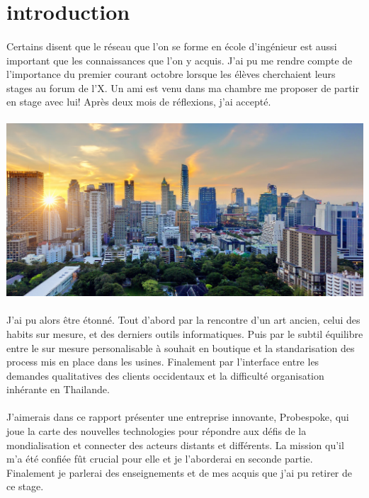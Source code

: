 \section*{introduction}
\paragraph{}
Certains disent que le réseau que l'on se forme en école d'ingénieur est aussi important que les connaissances que l'on y acquis. J'ai pu me rendre compte de l'importance du premier courant octobre lorsque les élèves cherchaient leurs stages au forum de l'X. Un ami est venu dans ma chambre me proposer de partir en stage avec lui! Après deux mois de réflexions, j'ai accepté.
\paragraph{}
\includegraphics[width=16cm]{image/business.jpg}
\paragraph{}
J'ai pu alors être étonné. Tout d'abord par la rencontre d'un art ancien, celui des habits sur mesure, et des derniers outils informatiques. Puis par le subtil équilibre entre le sur mesure personalisable à souhait en boutique et la standarisation des process mis en place dans les usines. Finalement par l'interface entre les demandes qualitatives des clients occidentaux et la difficulté organisation inhérante en Thailande.
\paragraph{}
J'aimerais dans ce rapport présenter une entreprise innovante, Probespoke, qui joue la carte des nouvelles technologies pour répondre aux défis de la mondialisation et connecter des acteurs distants et différents. La mission qu'il m'a été confiée fût crucial pour elle et je l'aborderai en seconde partie. Finalement je parlerai des enseignements et de mes acquis que j'ai pu retirer de ce stage.
